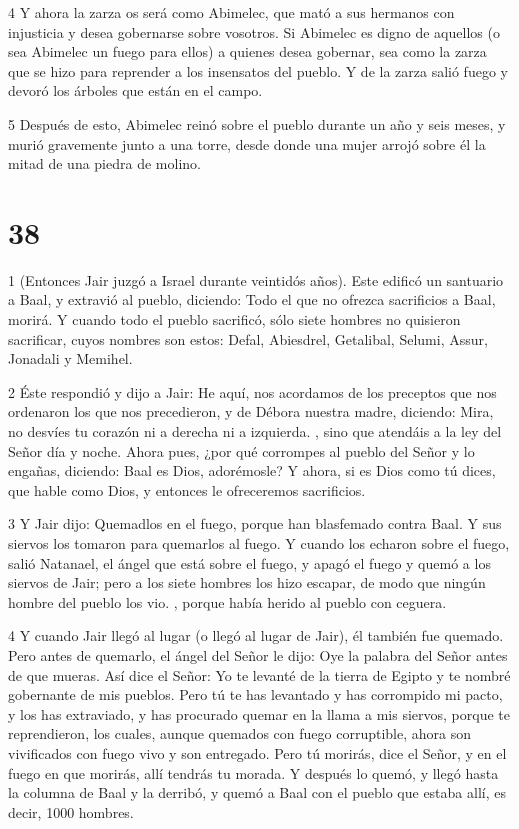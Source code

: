 \par 4 Y ahora la zarza os será como Abimelec, que mató a sus hermanos con injusticia y desea gobernarse sobre vosotros. Si Abimelec es digno de aquellos (o sea Abimelec un fuego para ellos) a quienes desea gobernar, sea como la zarza que se hizo para reprender a los insensatos del pueblo. Y de la zarza salió fuego y devoró los árboles que están en el campo.

\par 5 Después de esto, Abimelec reinó sobre el pueblo durante un año y seis meses, y murió gravemente junto a una torre, desde donde una mujer arrojó sobre él la mitad de una piedra de molino.

\par [Un espacio de longitud incierta en el texto.]

\chapter{38}

\par 1 (Entonces Jair juzgó a Israel durante veintidós años). Este edificó un santuario a Baal, y extravió al pueblo, diciendo: Todo el que no ofrezca sacrificios a Baal, morirá. Y cuando todo el pueblo sacrificó, sólo siete hombres no quisieron sacrificar, cuyos nombres son estos: Defal, Abiesdrel, Getalibal, Selumi, Assur, Jonadali y Memihel.

\par 2 Éste respondió y dijo a Jair: He aquí, nos acordamos de los preceptos que nos ordenaron los que nos precedieron, y de Débora nuestra madre, diciendo: Mira, no desvíes tu corazón ni a derecha ni a izquierda. , sino que atendáis a la ley del Señor día y noche. Ahora pues, ¿por qué corrompes al pueblo del Señor y lo engañas, diciendo: Baal es Dios, adorémosle? Y ahora, si es Dios como tú dices, que hable como Dios, y entonces le ofreceremos sacrificios.

\par 3 Y Jair dijo: Quemadlos en el fuego, porque han blasfemado contra Baal. Y sus siervos los tomaron para quemarlos al fuego. Y cuando los echaron sobre el fuego, salió Natanael, el ángel que está sobre el fuego, y apagó el fuego y quemó a los siervos de Jair; pero a los siete hombres los hizo escapar, de modo que ningún hombre del pueblo los vio. , porque había herido al pueblo con ceguera.

\par 4 Y cuando Jair llegó al lugar (o llegó al lugar de Jair), él también fue quemado. Pero antes de quemarlo, el ángel del Señor le dijo: Oye la palabra del Señor antes de que mueras. Así dice el Señor: Yo te levanté de la tierra de Egipto y te nombré gobernante de mis pueblos. Pero tú te has levantado y has corrompido mi pacto, y los has extraviado, y has procurado quemar en la llama a mis siervos, porque te reprendieron, los cuales, aunque quemados con fuego corruptible, ahora son vivificados con fuego vivo y son entregado. Pero tú morirás, dice el Señor, y en el fuego en que morirás, allí tendrás tu morada. Y después lo quemó, y llegó hasta la columna de Baal y la derribó, y quemó a Baal con el pueblo que estaba allí, es decir, 1000 hombres.

